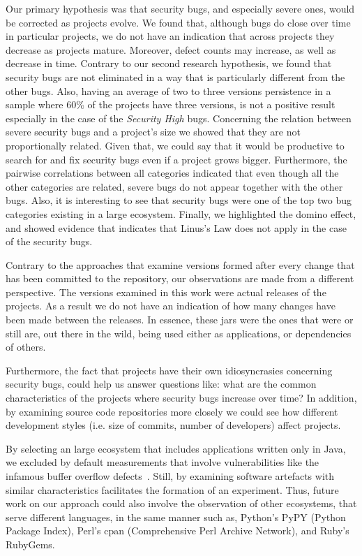 \documentclass{sig-alternate}
\begin{document}
Our primary hypothesis was that security bugs, and especially severe
ones, would be corrected as projects evolve. We found that, although
bugs do close over time in particular projects, we do not have an indication that across
projects they decrease as projects mature. Moreover, defect counts may
increase, as well as decrease in time. Contrary to our second research hypothesis,
we found that security
bugs are not eliminated in a way that is particularly different from the other bugs.
Also, having an average of two to three versions persistence in a sample where 60\%
of the projects have three versions, is not a positive result especially in the
case of the {\it Security High} bugs. Concerning the relation between
severe security bugs and a project's size
we showed that they are not proportionally related.
Given that, we could say that it would be productive to search for and fix
security bugs even if a project grows bigger.
Furthermore, the pairwise correlations between all categories
indicated that even though all the other
categories are related, severe bugs do not appear together with the other bugs.
Also, it is interesting to see that security bugs were one of the top two
bug categories existing in a large ecosystem. Finally, we highlighted the
domino effect, and showed evidence that indicates that Linus's Law does not
apply in the case of the security bugs.

Contrary to the approaches that examine versions
formed after every change that has been committed to the repository,
our observations are made from a different perspective.
The versions examined in this work were actual releases
of the projects. As a result we do not have an indication of how many changes
have been made between the releases.
In essence, these {\sc jar}s were the ones that were or still are,
out there in the wild, being used either as applications,
or dependencies of others.

Furthermore, the fact that projects have their own idiosyncrasies concerning
security bugs, could help us answer questions like: what are the common
characteristics of the projects where security bugs increase over time?
In addition, by examining source code repositories more closely we could see how
different development styles (i.e. size of commits, number of developers)
affect projects.

By selecting an large ecosystem that includes applications written only
in Java, we excluded by default measurements that involve vulnerabilities like
the infamous buffer overflow defects~\cite{K11}. Still, by examining software
artefacts with similar characteristics facilitates the formation of
an experiment. Thus, future work on our approach could also involve
the observation of other ecosystems, that serve different languages,
in the same manner such as, Python's PyPY (Python Package Index),
Perl's {\sc cpan} (Comprehensive Perl Archive Network), and Ruby's
RubyGems.
\end{document}
